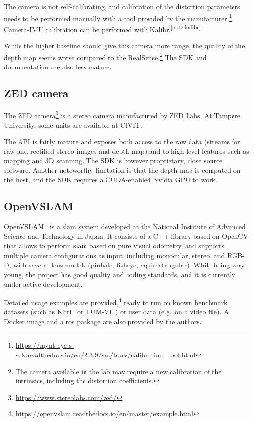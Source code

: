\documentclass[11pt, letterpaper, twoside]{article}
\begin{document}
The camera is not self-calibrating, and calibration of the distortion
parameters needs to be performed manually with a tool provided by the
manufacturer.\footnote{\url{https://mynt-eye-s-sdk.readthedocs.io/en/2.3.9/src/tools/calibration_tool.html}}
Camera-IMU calibration can be performed with
Kalibr.\textsuperscript{\ref{note:kalibr}}

While the higher baseline should give this camera more range, the quality of
the depth map seems worse compared to the RealSense.\footnote{The camera
available in the lab may require a new calibration of the intrinsics, including
the distortion coefficients.} The SDK and documentation are also less mature.

\subsection{ZED camera}

The ZED camera\footnote{\url{https://www.stereolabs.com/zed/}} is a stereo
camera manufactured by ZED Labs. At Tampere University, some units are
available at CIVIT.

The API is fairly mature and exposes both access to the raw data (streams for
raw and rectified stereo images and depth map) and to high-level features such
as mapping and 3D scanning. The SDK is however proprietary, close source
software. Another noteworthy limitation is that the depth map is computed on
the host, and the SDK requires a CUDA-enabled Nvidia GPU to work.

\subsection{OpenVSLAM}

OpenVSLAM~\cite{openvslam2019} is a \gls{slam} system developed at the National
Institute of Advanced Science and Technology in Japan. It consists of a C++
library based on OpenCV that allows to perform \gls{slam} based on pure visual
odometry, and supports multiple camera configurations as input, including
monocular, stereo, and RGB-D, with several lens models (pinhole, fisheye,
equirectangular). While being very young, the project has good quality and
coding standards, and it is currently under active development.

Detailed usage examples are
provided,\footnote{\url{https://openvslam.readthedocs.io/en/master/example.html}}
ready to run on known benchmark datasets (such as Kitti~\cite{geiger2013vision}
or TUM-VI~\cite{schubert2018vidataset}) or user data (e.g.\ on a video file). A
Docker image and a \gls{ros} package are also provided by the authors.
\end{document}
